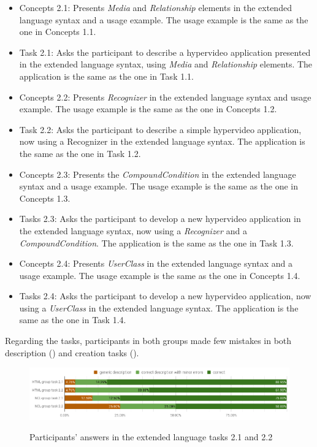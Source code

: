 \begin{itemize}
	\item Concepts 2.1: Presents \textit{Media} and \textit{Relationship} elements
	in the extended language syntax and a usage example. The usage example is the
	same as the one in Concepts 1.1.
	\item Task 2.1: Asks the participant to describe a hypervideo application
	presented in the extended language syntax, using \textit{Media} and
	\textit{Relationship} elements. The application is the same as the one in Task
	1.1.
	\item Concepts 2.2: Presents \textit{Recognizer} in the extended language
	syntax and usage example. The usage example is the same as the one in Concepts
	1.2.
	\item Task 2.2: Asks the participant to describe a simple hypervideo
	application, now using a Recognizer in the extended language syntax. The
	application is the same as the one in Task 1.2.
	\item Concepts 2.3: Presents the \textit{CompoundCondition} in the extended
	language syntax and a usage example. The usage example is the same as the one
	in Concepts 1.3.
	\item Tasks 2.3: Asks the participant to develop a new hypervideo application
	in the extended language syntax, now using a \textit{Recognizer} and a
	\textit{CompoundCondition}. The application is the same as the one in Task
	1.3.
	\item Concepts 2.4: Presents \textit{UserClass} in the extended language
	syntax and a usage example. The usage example is the same as the one in
	Concepts 1.4.
	\item Tasks 2.4: Asks the participant to develop a new hypervideo application,
	now using a \textit{UserClass} in the extended language syntax. The
	application is the same as the one in Task 1.4.
\end{itemize}

Regarding the tasks, participants in both groups made few mistakes in both
description () and creation tasks ().

\begin{figure}[!ht]
\begin{center}
	\includegraphics[width=14cm, keepaspectratio]{img/img23.png}
    \captionvspace
	\caption{Participants’ answers in the extended language tasks 2.1 and 2.2}
    \captionvspace
	\label{fig:lang-res1}
\end{center}
\end{figure}

